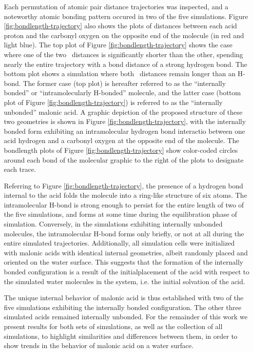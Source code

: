 Each permutation of atomic pair distance trajectories was inspected, and a noteworthy atomic bonding pattern occured in two of the five simulations. Figure \ref{fig:bondlength-trajectory} also shows the plots of distances between each acid proton and the carbonyl oxygen on the opposite end of the molecule (in red and light blue). The top plot of Figure \ref{fig:bondlength-trajectory} shows the case where one of the two \ocarbh~distances is significantly shorter than the other, spending nearly the entire trajectory with a bond distance of a strong hydrogen bond. The bottom plot shows a simulation where both \ocarbh~distances remain longer than an H-bond. The former case (top plot) is hereafter referred to as the ``internally bonded'' or ``intramolecularly H-bonded'' molecule, and the latter case (bottom plot of Figure \ref{fig:bondlength-trajectory}) is referred to as the ``internally unbonded'' malonic acid. A graphic depiction of the proposed structure of these two geometries is shown in Figure \ref{fig:bondlength-trajectory}, with the internally bonded form exhibiting an intramolecular hydrogen bond interactio between one acid hydrogen and a carbonyl oxygen at the opposite end of the molecule. The bondlength plots of Figure \ref{fig:bondlength-trajectory} show color-coded circles around each bond of the molecular graphic to the right of the plots to designate each trace.

Referring to Figure \ref{fig:bondlength-trajectory}, the presence of a hydrogen bond internal to the acid folds the molecule into a ring-like structure of six atoms. The intramolecular H-bond is strong enough to persist for the entire length of two of the five simulations, and forms at some time during the equilibration phase of simulation. Conversely, in the simulations exhibiting internally unbonded molecules, the intramolecular H-bond forms only briefly, or not at all during the entire simulated trajectories. Additionally, all simulation cells were initialized with malonic acids with identical internal geometries, albeit randomly placed and oriented on the water surface. This suggests that the formation of the internally bonded configuration is a result of the initialplacement of the acid with respect to the simulated water molecules in the system, i.e. the initial solvation of the acid.

The unique internal behavior of malonic acid is thus established with two of the five simulations exhibiting the internally bonded configuration. The other three simulated acids remained internally unbonded. For the remainder of this work we present results for both sets of simulations, as well as the collection of all simulations, to highlight similarities and differences between them, in order to show trends in the behavior of malonic acid on a water surface.

